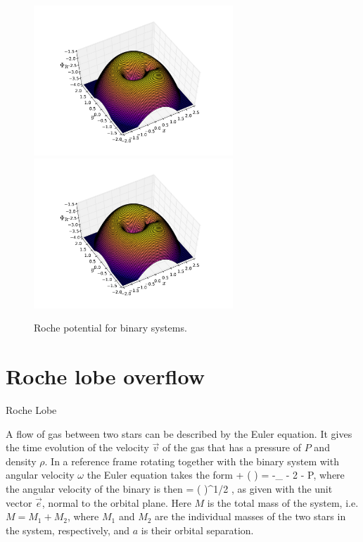 \begin{figure}[t]
\centering
\includegraphics[width=7.5cm]{figs/astro/roche.pdf}
\includegraphics[width=7.5cm]{figs/astro/roche.pdf}
\caption{\label{fig:roche}
Roche potential for binary systems.
}
\end{figure}


\section{Roche lobe overflow}
Roche Lobe \cite{PRP02} \cite{LL15}

A flow of gas between two stars can be described by the Euler equation.
It gives the time evolution of the velocity $\vec{v}$ of the gas that has a pressure of $P$ and density $\rho$.
In a reference frame rotating together with the binary system with angular velocity $\omega$ the Euler equation takes the form 
\be
{} + ( \cdot \nabla) = -\nabla \Phi_{} - 2 \vec{ \omega } \times {} -  \nabla P,
\ee
where the angular velocity of the binary is then
\be
\vec{ \omega } = \left(  \right)^{1/2} ,
\ee
as given with the unit vector $\vec{e}$, normal to the orbital plane.
Here $M$ is the total mass of the system, i.e. $M = M_1 + M_2$, where $M_1$ and $M_2$ are the individual masses of the two stars in the system, respectively, and $a$ is their orbital separation.

